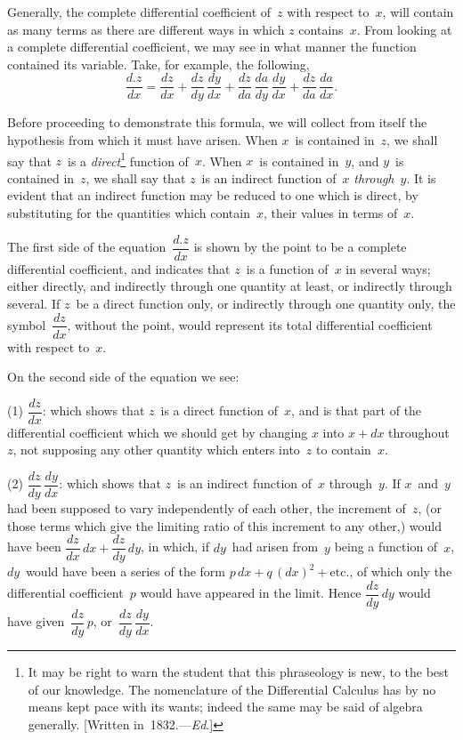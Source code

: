 \documentclass[12pt]{book}[2005/09/16]
\newcommand{\Pagelabel}[1]{\phantomsection\label{page:#1}}
\newcommand{\PageSep}[1]{\Pagelabel{#1}\ignorespaces}
\renewcommand{\etc}{\text{etc}}
\newcommand{\Ed}{\textit{Ed}}
\renewcommand{\(}{{\upshape(}}
\renewcommand{\)}{{\upshape)}}
\begin{document}
Generally, the complete differential coefficient of~$z$
with respect to~$x$, will contain as many terms as there
are different ways in which $z$ contains~$x$. From looking
at a complete differential coefficient, we may see
in what manner the function contained its variable.
Take, for example, the following,
\[
\frac{d.z}{dx}
  = \frac{dz}{dx} + \frac{dz}{dy}\, \frac{dy}{dx}
    + \frac{dz}{da}\, \frac{da}{dy}\, \frac{dy}{dx}
    + \frac{dz}{da}\, \frac{da}{dx}.
\]

Before proceeding to demonstrate this formula, we
will collect from itself the hypothesis from which it
\PageSep{97}
%
must have arisen. When $x$~is contained in~$z$, we shall
say that $z$~is a \emph{direct}\footnote
  {It may be right to warn the student that this phraseology is new, to the
  best of our knowledge. The nomenclature of the Differential Calculus has
  by no means kept pace with its wants; indeed the same may be said of algebra
  generally. [Written in~1832.---\Ed.]}
function of~$x$. When $x$~is contained
in~$y$, and $y$~is contained in~$z$, we shall say that
$z$~is an indirect function of~$x$ \emph{through}~$y$. It is evident
%
that an indirect function may be reduced to one which
is direct, by substituting for the quantities which contain~$x$,
their values in terms of~$x$.

The first side of the equation~$\dfrac{d.z}{dx}$ is shown by the
point to be a complete differential coefficient, and indicates
that $z$~is a function of~$x$ in several ways; either
directly, and indirectly through one quantity at least,
or indirectly through several. If $z$~be a direct function
%
only, or indirectly through one quantity only, the
symbol~$\dfrac{dz}{dx}$, without the point, would represent its
total differential coefficient with respect to~$x$.

On the second side of the equation we see:

(1) $\dfrac{dz}{dx}$: which shows that $z$~is a direct function of~$x$,
and is that part of the differential coefficient which
we should get by changing $x$ into $x + dx$ throughout~$z$,
not supposing any other quantity which enters into~$z$
to contain~$x$.

(2) $\dfrac{dz}{dy}\, \dfrac{dy}{dx}$: which shows that $z$~is an indirect function
of~$x$ through~$y$. If $x$~and~$y$ had been supposed to
vary independently of each other, the increment of~$z$,
(or those terms which give the limiting ratio of this
increment to any other,) would have been $\dfrac{dz}{dx}\, dx + \dfrac{dz}{dy}\, dy$,
in which, if $dy$~had arisen from~$y$ being a function
\PageSep{98}
of~$x$, $dy$~would have been a series of the form
$p\, dx + q\, (dx)^{2} + \etc.$, of which only the differential coefficient~$p$
would have appeared in the limit. Hence
$\dfrac{dz}{dy}\, dy$ would have given~$\dfrac{dz}{dy}\, p$, or~$\dfrac{dz}{dy}\, \dfrac{dy}{dx}$.
\end{document}
